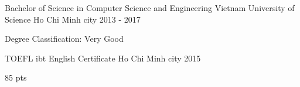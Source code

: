 \vspace{\baselineskip}
\vspace{\baselineskip}
\vspace{\baselineskip}


\begin{cventries}

  \cventry
    {Bachelor of Science in Computer Science and Engineering} %
    {Vietnam University of Science} %
    {Ho Chi Minh city} %
    {2013 - 2017} %
    {
      \begin{cvitems} %
        \item {Degree Classification: Very Good}
      \end{cvitems}
    }

\cventry
    {TOEFL ibt} %
    {English Certificate} %
    {Ho Chi Minh city} %
    {2015} %
    {
      \begin{cvitems} %
        \item {85 pts}
      \end{cvitems}
    }

\end{cventries}
